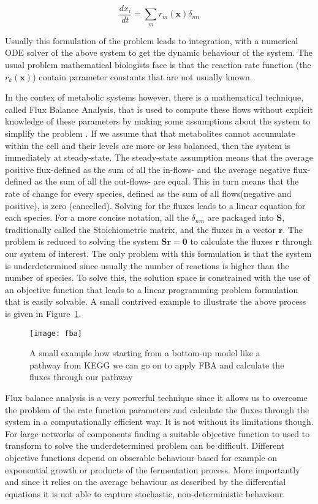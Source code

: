 \begin{equation*}
\frac{dx_i}{dt} = \sum_{m} r_m(\mathbf{x})\delta_{mi}
\end{equation*}

Usually this formulation of the problem leads to integration, with a
numerical ODE solver of the above system to get the dynamic behaviour
of the system. The usual problem mathematical biologists face is that
the reaction rate function (the $r_k(\mathbf{x})$) contain parameter
constants that are not usually known.

In the contex of metabolic systems however, there is a mathematical technique, called Flux Balance
Analysis, that is used to compute these flows without explicit
knowledge of these parameters by making some assumptions about the
system to simplify the problem \cite [] {orth2010flux}. If we assume that that metabolites
cannot accumulate within the cell and their levels are more or less
balanced, then the system is immediately at steady-state. The steady-state assumption means that the average positive flux-defined as the sum of
all the in-flows- and the average negative flux-defined as the sum of
all the out-flows- are equal. This in turn means that the rate of
change for every species, defined as the sum of all flows(negative and
positive), is zero (cancelled). Solving for the fluxes leads to a linear equation for each
species. For a more concise notation, all the $\delta_{nm}$ are
packaged into $\mathbf{S}$, traditionally called the Stoichiometric
matrix, and the fluxes in a vector $\mathbf{r}$. The problem
is reduced to solving the system $\mathbf{Sr} = \mathbf{0}$ to calculate the
fluxes $\mathbf{r}$ through our system of interest. The only problem
with this formulation is that the system is
underdetermined since usually the number of reactions is higher than
the number of species. To solve this, the solution space is constrained
with the use of an objective function that leads to a linear
programming problem formulation that is easily solvable. A small
contrived example to illustrate the above process is given in
Figure~\ref{fig:fba}.

\begin{figure}[htbp!]
\centering
\texttt{[image: fba]}
\caption[Flux Balance analysis]{A small example how starting from a
  bottom-up model like a pathway from KEGG we can go on to apply FBA
  and calculate the fluxes through our pathway}
\label{fig:fba}
\end{figure}

Flux balance analysis is a very powerful technique since it allows us
to overcome the problem of the rate function parameters and calculate the
fluxes through the system in a computationally efficient way. It is
not without its limitations though. For large networks of components
finding a suitable objective function to used to transform to solve
the underdetermined problem can be difficult. Different objective
functions depend on obserable behaviour based for example on
exponential growth or products of the fermentation process. More importantly and
since it relies on the average behaviour as described by the
differential equations it is not able to capture stochastic,
non-deterministic behaviour.


